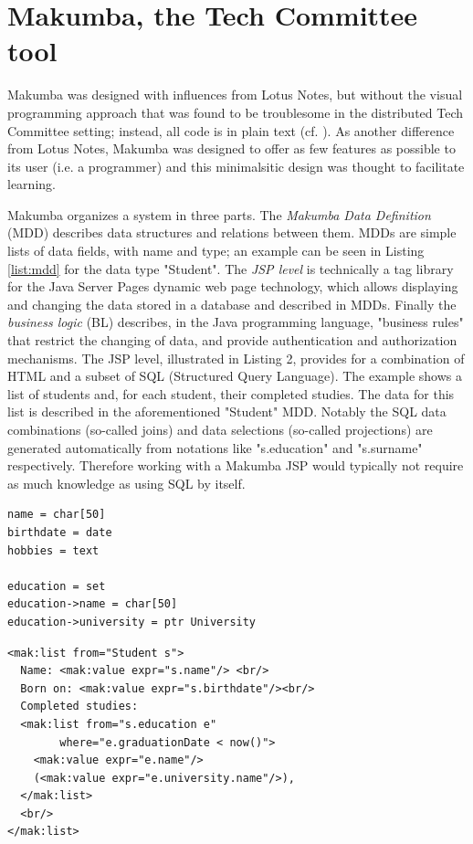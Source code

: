 \documentclass{sig-alt-release2}
\begin{document}
\section{Makumba, the Tech Committee tool}\label{sec:makumba}

Makumba was designed with influences from Lotus Notes, but without the visual programming approach that was found to be troublesome in the distributed Tech Committee setting; instead, all code is in plain text (cf. \cite{yamauchi00}). As another difference from Lotus Notes, Makumba was designed to offer as few features as possible to its user (i.e. a programmer) and this minimalsitic design was thought to facilitate learning. 

Makumba organizes a system in three parts. The \textit{Makumba Data Definition} (MDD) describes data structures and relations between them. MDDs are simple lists of data fields, with name and type; an example can be seen in Listing \ref{list:mdd} for the data type "Student". The \textit{JSP level} is technically a tag library for the Java Server Pages dynamic web page technology, which allows displaying and changing the data stored in a database and described in MDDs. Finally the \textit{business logic} (BL) describes, in the Java programming language, %
"business rules" that restrict the changing of data, and provide authentication and authorization mechanisms. The JSP level, illustrated in Listing 2, provides for a combination of HTML and a subset of SQL (Structured Query Language). The example shows a list of students and, for each student, their completed studies. The data for this list is described in the aforementioned "Student" MDD. Notably the SQL data combinations (so-called joins) and data selections (so-called projections) are generated automatically from notations like "s.education" and "s.surname" respectively. Therefore working with a Makumba JSP would typically not require as much knowledge as using SQL by itself.

\lstset{basicstyle=\small, captionpos=b, caption=Makumba Data Definition "Student", label=list:mdd, frame=shadowbox}
\begin{lstlisting}
name = char[50]
birthdate = date
hobbies = text

education = set
education->name = char[50]
education->university = ptr University
\end{lstlisting}

\lstset{basicstyle=\small, captionpos=b, caption=Example of viewing data with the Makumba JSP tag library, label=list:mak, frame=shadowbox}
\begin{lstlisting}
<mak:list from="Student s">
  Name: <mak:value expr="s.name"/> <br/>
  Born on: <mak:value expr="s.birthdate"/><br/>
  Completed studies:
  <mak:list from="s.education e"
  	    where="e.graduationDate < now()">
    <mak:value expr="e.name"/>
    (<mak:value expr="e.university.name"/>),
  </mak:list>
  <br/>
</mak:list>
\end{lstlisting}
\end{document}
